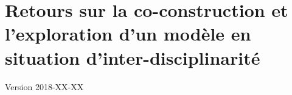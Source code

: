 \chapter{Retours sur la co-construction et l'exploration d'un modèle en situation d'inter-disciplinarité}
\begin{center}
	{\large Version 2018-XX-XX}
\end{center}

